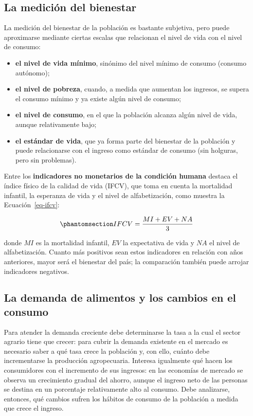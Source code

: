 \documentclass[
  man,
  floatsintext,
  longtable,
  a4paper,
  nolmodern,
  notxfonts,
  notimes,
  12pt,
  colorlinks=true,linkcolor=blue,citecolor=blue,urlcolor=blue]{apa7}
\providecommand{\tightlist}{%
  \setlength{\itemsep}{0pt}\setlength{\parskip}{0pt}}
\begin{document}
\subsection{La medición del
bienestar}\label{la-mediciuxf3n-del-bienestar}

La medición del bienestar de la población es bastante subjetiva, pero
puede aproximarse mediante ciertas escalas que relacionan el nivel de
vida con el nivel de consumo:

\begin{itemize}
\tightlist
\item
  \textbf{el nivel de vida mínimo}, sinónimo del nivel mínimo de consumo
  (consumo autónomo);
\item
  \textbf{el nivel de pobreza}, cuando, a medida que aumentan los
  ingresos, se supera el consumo mínimo y ya existe algún nivel de
  consumo;
\item
  \textbf{el nivel de consumo}, en el que la población alcanza algún
  nivel de vida, aunque relativamente bajo;
\item
  \textbf{el estándar de vida}, que ya forma parte del bienestar de la
  población y puede relacionarse con el ingreso como estándar de consumo
  (sin holguras, pero sin problemas).
\end{itemize}

Entre los \textbf{indicadores no monetarios de la condición humana}
destaca el índice físico de la calidad de vida (IFCV), que toma en
cuenta la mortalidad infantil, la esperanza de vida y el nivel de
alfabetización, como muestra la Ecuación~\ref{eq-ifcv}:

\begin{equation}\protect\phantomsection\label{eq-ifcv}{
IFCV = \frac{MI + EV + NA}{3}
}\end{equation}

donde \(MI\) es la mortalidad infantil, \(EV\) la expectativa de vida y
\(NA\) el nivel de alfabetización. Cuanto más positivos sean estos
indicadores en relación con años anteriores, mayor será el bienestar del
país; la comparación también puede arrojar indicadores negativos.

\subsection{La demanda de alimentos y los cambios en el
consumo}\label{la-demanda-de-alimentos-y-los-cambios-en-el-consumo}

Para atender la demanda creciente debe determinarse la tasa a la cual el
sector agrario tiene que crecer: para cubrir la demanda existente en el
mercado es necesario saber a qué tasa crece la población y, con ello,
cuánto debe incrementarse la producción agropecuaria. Interesa
igualmente qué hacen los consumidores con el incremento de sus ingresos:
en las economías de mercado se observa un crecimiento gradual del
ahorro, aunque el ingreso neto de las personas se destina en un
porcentaje relativamente alto al consumo. Debe analizarse, entonces, qué
cambios sufren los hábitos de consumo de la población a medida que crece
el ingreso.
\end{document}
